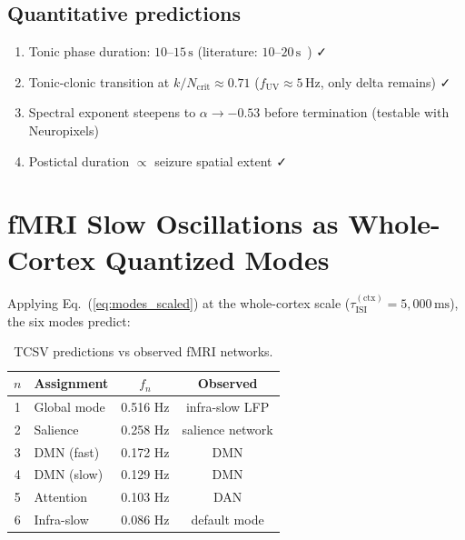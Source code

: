 \documentclass[aps,pre,twocolumn,showpacs,superscriptaddress,longbibliography]{revtex4-2}
\newcommand{\kN}{k/N}
\newcommand{\tauISI}{\tau_{\mathrm{ISI}}}
\begin{document}
\subsection{Quantitative predictions}

\begin{enumerate}
\item Tonic phase duration: $10$--$15\,\mathrm{s}$
  (literature: $10$--$20\,\mathrm{s}$~\cite{Perucca2014}) ✓
\item Tonic-clonic transition at $\kN_{\mathrm{crit}} \approx 0.71$
  ($f_\mathrm{UV} \approx 5\,\mathrm{Hz}$, only delta remains) ✓
\item Spectral exponent steepens to $\alpha \to -0.53$
  before termination (testable with Neuropixels)
\item Postictal duration $\propto$ seizure spatial extent ✓
\end{enumerate}

\section{\label{sec:fmri}fMRI Slow Oscillations as Whole-Cortex
         Quantized Modes}

Applying Eq.~(\ref{eq:modes_scaled}) at the whole-cortex scale
($\tauISI^{(\mathrm{ctx})} = 5{,}000\,\mathrm{ms}$), the six
modes predict:

\begin{table}[h]
\caption{\label{tab:fmri}TCSV predictions vs observed fMRI networks.}
\begin{ruledtabular}
\begin{tabular}{clcc}
$n$ & Assignment & $f_n$ & Observed \\
\hline
1 & Global mode    & 0.516 Hz & infra-slow LFP \\
2 & Salience       & 0.258 Hz & salience network \\
3 & DMN (fast)     & 0.172 Hz & DMN \\
4 & DMN (slow)     & 0.129 Hz & DMN \\
5 & Attention      & 0.103 Hz & DAN \\
6 & Infra-slow     & 0.086 Hz & default mode \\
\end{tabular}
\end{ruledtabular}
\end{table}
\end{document}
